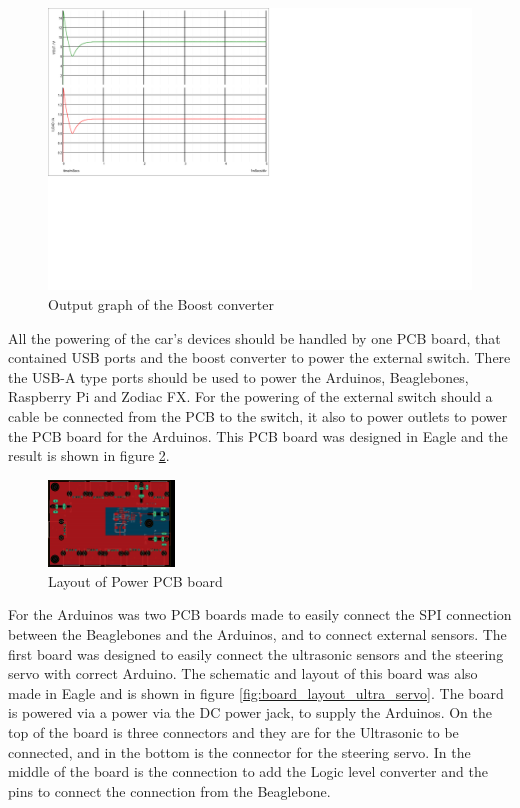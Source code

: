 \documentclass[11pt, titlepage]{article} %
\begin{document}
\begin{figure}
	\includegraphics{graph_of_boost_out.png}
	\caption{Output graph of the Boost converter}
	\label{fig:graph_boost}
\end{figure}

All the powering of the car's devices should be handled by one PCB board, that contained USB ports and the boost converter to power the external switch. There the USB-A type ports should be used to power the Arduinos, Beaglebones, Raspberry Pi and Zodiac FX. For the powering of the external switch should a cable be connected from the PCB to the switch, it also to power outlets to power the PCB board for the Arduinos. This PCB board was designed in Eagle and the result is shown in figure \ref{fig:power_pcb_layout}. 

\begin{figure}
	\includegraphics[width=0.3\textwidth]{power_board_layout.png}
	\caption{Layout of Power PCB board}
    \label{fig:power_pcb_layout}
\end{figure}

For the Arduinos was two PCB boards made to easily connect the SPI connection between the Beaglebones and the Arduinos, and to connect external sensors. The first board was designed to easily connect the ultrasonic sensors and the steering servo with correct Arduino. The schematic and layout of this board was also made in Eagle and is shown in figure \ref{fig:board_layout_ultra_servo}. The board is powered via a power via the DC power jack, to supply the Arduinos. On the top of the board is three connectors and they are for the Ultrasonic to be connected, and in the bottom is the connector for the steering servo. In the middle of the board is the connection to add the Logic level converter and the pins to connect the connection from the Beaglebone. 
\end{document}
